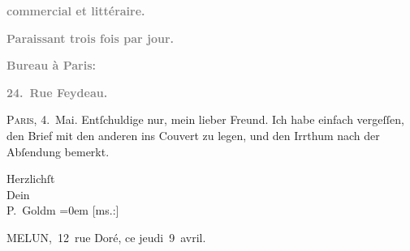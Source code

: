 \pstart
           \begin{otherlanguage}{french}\textcolor{gray}{\textbf{commercial et littéraire.}}\end{otherlanguage}\pend
           
\pstart
           \begin{otherlanguage}{french}\textcolor{gray}{\textbf{\textbf{Paraissant trois fois par jour.}}}\end{otherlanguage}\pend
           
\pstart
           \begin{otherlanguage}{french}\textcolor{gray}{\textbf{\textbf{Bureau à Paris:}}}\end{otherlanguage}\pend
           
\pstart
           \begin{otherlanguage}{french}\textcolor{gray}{\textbf{\textbf{24. Rue Feydeau.}}}\end{otherlanguage}\hfill \textsc{Paris}, 4. Mai.\pend
           \vspace{0.5em}
\pstart
           {\pb}Entſchuldige nur, mein lieber
                  Freund. Ich habe einfach vergeſſen, den Brief mit den anderen ins Couvert
               zu legen, und den Irrthum \label{K_L02773-1v}\label{K_L02773-1} nach der Abſendung bemerkt.\pend
           
\pstart
           Herzlichſt {\\[\baselineskip]}Dein {\\[\baselineskip]}\spacefill\mbox{P. Goldm}\pend
           \leftskip=0em{}\vspace{1em}{\vspace{1\baselineskip}}
\pstart
           {\pb}{[}ms.:{]} \begin{otherlanguage}{french}MELUN, 12 rue Doré, ce jeudi 9 avril.\end{otherlanguage}\pend
           
